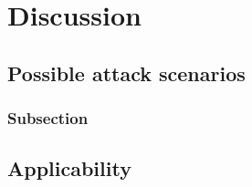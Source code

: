 \chapter{Discussion}
\label{chp:discussion} 

\section{Possible attack scenarios}\label{sec:attack_scenarios}

\subsection{Subsection}\label{sec:first_ssection}


\section{Applicability}\label{sec:applicability}

